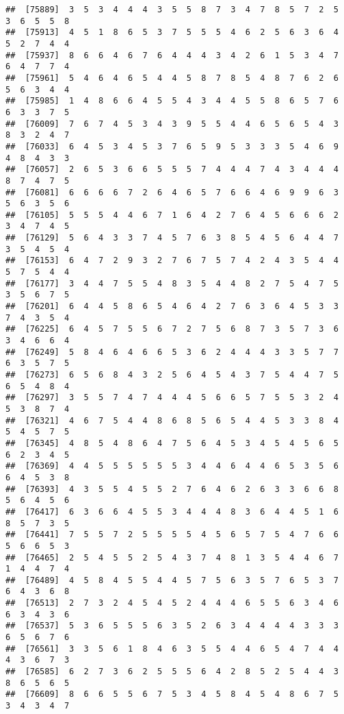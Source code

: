 \documentclass[
]{book}
\begin{document}
\begin{verbatim}
##  [75889]  3  5  3  4  4  4  3  5  5  8  7  3  4  7  8  5  7  2  5  3  6  5  5  8
##  [75913]  4  5  1  8  6  5  3  7  5  5  5  4  6  2  5  6  3  6  4  5  2  7  4  4
##  [75937]  8  6  6  4  6  7  6  4  4  4  3  4  2  6  1  5  3  4  7  6  4  7  7  4
##  [75961]  5  4  6  4  6  5  4  4  5  8  7  8  5  4  8  7  6  2  6  5  6  3  4  4
##  [75985]  1  4  8  6  6  4  5  5  4  3  4  4  5  5  8  6  5  7  6  6  3  3  7  5
##  [76009]  7  6  7  4  5  3  4  3  9  5  5  4  4  6  5  6  5  4  3  8  3  2  4  7
##  [76033]  6  4  5  3  4  5  3  7  6  5  9  5  3  3  3  5  4  6  9  4  8  4  3  3
##  [76057]  2  6  5  3  6  6  5  5  5  7  4  4  4  7  4  3  4  4  4  8  7  4  7  5
##  [76081]  6  6  6  6  7  2  6  4  6  5  7  6  6  4  6  9  9  6  3  5  6  3  5  6
##  [76105]  5  5  5  4  4  6  7  1  6  4  2  7  6  4  5  6  6  6  2  3  4  7  4  5
##  [76129]  5  6  4  3  3  7  4  5  7  6  3  8  5  4  5  6  4  4  7  3  5  4  5  4
##  [76153]  6  4  7  2  9  3  2  7  6  7  5  7  4  2  4  3  5  4  4  5  7  5  4  4
##  [76177]  3  4  4  7  5  5  4  8  3  5  4  4  8  2  7  5  4  7  5  3  5  6  7  5
##  [76201]  6  4  4  5  8  6  5  4  6  4  2  7  6  3  6  4  5  3  3  7  4  3  5  4
##  [76225]  6  4  5  7  5  5  6  7  2  7  5  6  8  7  3  5  7  3  6  3  4  6  6  4
##  [76249]  5  8  4  6  4  6  6  5  3  6  2  4  4  4  3  3  5  7  7  6  3  5  7  5
##  [76273]  6  5  6  8  4  3  2  5  6  4  5  4  3  7  5  4  4  7  5  6  5  4  8  4
##  [76297]  3  5  5  7  4  7  4  4  4  5  6  6  5  7  5  5  3  2  4  5  3  8  7  4
##  [76321]  4  6  7  5  4  4  8  6  8  5  6  5  4  4  5  3  3  8  4  5  4  5  7  5
##  [76345]  4  8  5  4  8  6  4  7  5  6  4  5  3  4  5  4  5  6  5  6  2  3  4  5
##  [76369]  4  4  5  5  5  5  5  5  3  4  4  6  4  4  6  5  3  5  6  6  4  5  3  8
##  [76393]  4  3  5  5  4  5  5  2  7  6  4  6  2  6  3  3  6  6  8  5  6  4  5  6
##  [76417]  6  3  6  6  4  5  5  3  4  4  4  8  3  6  4  4  5  1  6  8  5  7  3  5
##  [76441]  7  5  5  7  2  5  5  5  5  4  5  6  5  7  5  4  7  6  6  5  6  6  5  3
##  [76465]  2  5  4  5  5  2  5  4  3  7  4  8  1  3  5  4  4  6  7  1  4  4  7  4
##  [76489]  4  5  8  4  5  5  4  4  5  7  5  6  3  5  7  6  5  3  7  6  4  3  6  8
##  [76513]  2  7  3  2  4  5  4  5  2  4  4  4  6  5  5  6  3  4  6  6  3  4  3  6
##  [76537]  5  3  6  5  5  5  6  3  5  2  6  3  4  4  4  4  3  3  3  6  5  6  7  6
##  [76561]  3  3  5  6  1  8  4  6  3  5  5  4  4  6  5  4  7  4  4  4  3  6  7  3
##  [76585]  6  2  7  3  6  2  5  5  5  6  4  2  8  5  2  5  4  4  3  8  6  5  6  5
##  [76609]  8  6  6  5  5  6  7  5  3  4  5  8  4  5  4  8  6  7  5  3  4  3  4  7

\end{verbatim}
\end{document}
